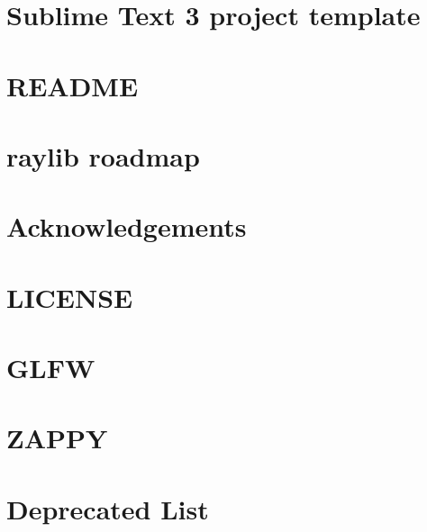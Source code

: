\let\mypdfximage\pdfximage\def\pdfximage{\immediate\mypdfximage}\documentclass[twoside]{book}
\newcommand{\+}{\discretionary{\mbox{\scriptsize$\hookleftarrow$}}{}{}}
\begin{document}
\chapter{Sublime Text 3 project template}
\label{md_build__deps_raylib_src_projects_SublimeText_README}

\chapter{README}
\label{md_build__deps_raylib_src_README}

\chapter{raylib roadmap}
\label{md_build__deps_raylib_src_ROADMAP}

\chapter{Acknowledgements}
\label{md_build__deps_raylib_src_src_external_glfw_CONTRIBUTORS}

\chapter{LICENSE}
\label{md_build__deps_raylib_src_src_external_glfw_LICENSE}

\chapter{GLFW}
\label{md_build__deps_raylib_src_src_external_glfw_README}

\chapter{ZAPPY}
\label{md_README}

\chapter{Deprecated List}
\label{deprecated}

\end{document}
